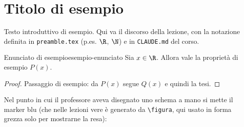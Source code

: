 %

\section{Titolo di esempio}

Testo introduttivo di esempio. Qui va il discorso della lezione, con la
notazione definita in \texttt{preamble.tex} (p.es. $\R$, $\N$) e in
\texttt{CLAUDE.md} del corso.

\begin{theorem}{Enunciato di esempio}{esempio-enunciato}
Sia $x \in \R$. Allora vale la proprietà di esempio $P(x)$.
\end{theorem}
\begin{proof}
Passaggio di esempio: da $P(x)$ segue $Q(x)$
e quindi la tesi.
\end{proof}

Nel punto in cui il professore aveva disegnato uno schema a mano si mette il
marker blu (che nelle lezioni vere è generato da \texttt{\textbackslash figura},
qui usato in forma grezza solo per mostrarne la resa):
